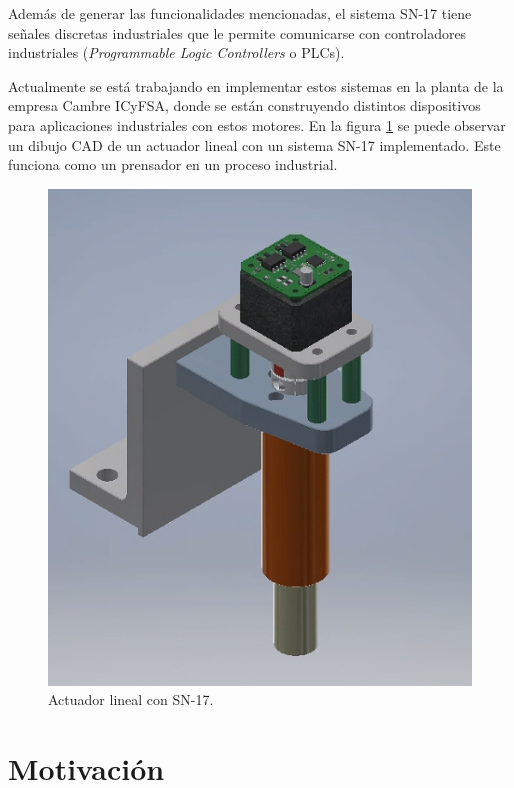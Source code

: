 Además de generar las funcionalidades mencionadas, el sistema SN-17 tiene señales discretas industriales que le permite comunicarse con controladores industriales (\textit{Programmable Logic Controllers} o PLCs).

Actualmente se está trabajando en implementar estos sistemas en la planta de la empresa Cambre ICyFSA\citep{web_cambre}, donde se están construyendo distintos dispositivos para aplicaciones industriales con estos motores. En la figura \ref{fig:aplicacionSN17} se puede observar un dibujo CAD de un actuador lineal con un sistema SN-17 implementado. Este funciona como un prensador en un proceso industrial.

\begin{figure}[h!]
	\centering
	\includegraphics[scale=.5]{./Figures/Prensador-N17.PNG}
	\caption{Actuador lineal con SN-17.}
	\label{fig:aplicacionSN17}
\end{figure}


\section{Motivación}

